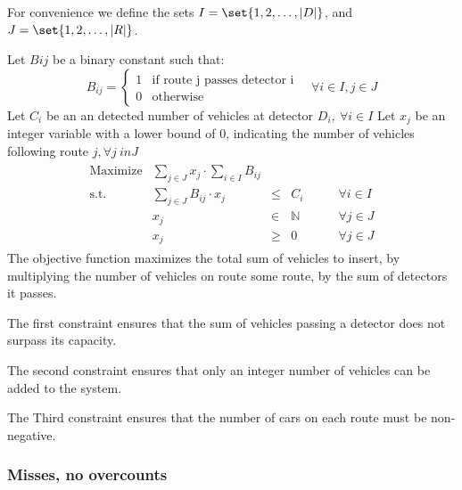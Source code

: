 For convenience we define the sets $I = \set{1, 2, \ldots, |D|}$, and $J = \set{1, 2, \ldots, |R|}$.

Let $B{ij}$ be a binary constant such that:
\[
  B_{ij} = \begin{cases}
    1 & \text{if route j passes detector i}\\
    0 & \text{otherwise}
  \end{cases}\quad \forall i \in I, j \in J
\]
Let $C_i$ be an an detected number of vehicles at detector $D_i,\ \forall i \in I$
Let $x_j$ be an integer variable with a lower bound of 0, indicating the number of vehicles following route $j, \forall j \ in J$
\begin{align*}
  \begin{array}{rrcll}
    \text{Maximize} & \sum_{j\in J}x_j \cdot \sum_{i\in I}B_{ij}&&&\\
    \text{s.t.} & \sum_{j\in J}B_{ij}\cdot x_j & \leq & C_i & \qquad \forall i \in I\\
    & x_j & \in & \mathbb{N}&\qquad \forall j \in J\\
    & x_j & \geq & 0&\qquad \forall j \in J
  \end{array}
\end{align*}
The objective function maximizes the total sum of vehicles to insert, by multiplying the number of vehicles on route some route, by the sum of detectors it passes. 

The first constraint ensures that the sum of vehicles passing a detector does not surpass its capacity.

The second constraint ensures that only an integer number of vehicles can be added to the system.

The Third constraint ensures that the number of cars on each route must be non-negative.

\subsubsection{Misses, no overcounts}